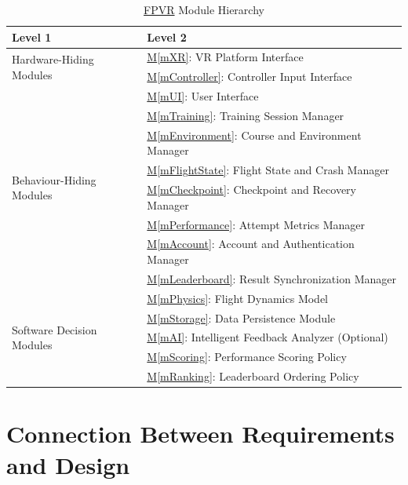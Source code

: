 \documentclass[12pt, titlepage]{article}
\DeclareRobustCommand{\mgabbr}[2]{\hyperlink{mg-abbr:#1}{#2}}
\newcommand{\mref}[1]{\hyperref[#1]{M\ref*{#1}}}
\begin{document}
\begin{table}[H]
\centering
\renewcommand{\arraystretch}{1.2}

\begin{tabularx}{\textwidth}{p{} X}

\toprule
\textbf{Level 1} & \textbf{Level 2} \\
\midrule

\multirow{2}{0.32\textwidth}{Hardware-Hiding Modules}
& \mref{mXR}: VR Platform Interface \\
& \mref{mController}: Controller Input Interface \\

\midrule

\multirow{8}{0.32\textwidth}{Behaviour-Hiding Modules}
& \mref{mUI}: User Interface \\
& \mref{mTraining}: Training Session Manager \\
& \mref{mEnvironment}: Course and Environment Manager \\
& \mref{mFlightState}: Flight State and Crash Manager \\
& \mref{mCheckpoint}: Checkpoint and Recovery Manager \\
& \mref{mPerformance}: Attempt Metrics Manager \\
& \mref{mAccount}: Account and Authentication Manager \\
& \mref{mLeaderboard}: Result Synchronization Manager \\

\midrule

\multirow{5}{0.32\textwidth}{Software Decision Modules}
& \mref{mPhysics}: Flight Dynamics Model \\
& \mref{mStorage}: Data Persistence Module \\
& \mref{mAI}: Intelligent Feedback Analyzer (Optional) \\
& \mref{mScoring}: Performance Scoring Policy \\
& \mref{mRanking}: Leaderboard Ordering Policy \\

\bottomrule
\end{tabularx}

\caption{\mgabbr{fpvr}{FPVR} Module Hierarchy}
\label{TblMH}
\end{table}

\section{Connection Between Requirements and Design}
\label{SecConnection}
\end{document}
